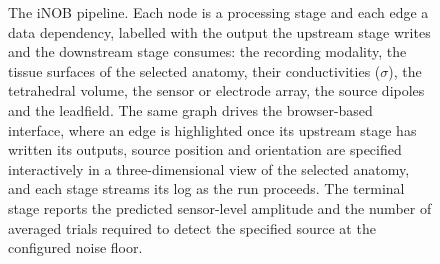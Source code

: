 \documentclass[11pt]{article}
\begin{document}
\begin{figure}[htbp]
\centering

\caption{The iNOB pipeline. Each node is a processing stage and each
edge a data dependency, labelled with the output the upstream stage
writes and the downstream stage consumes: the recording modality, the
tissue surfaces of the selected anatomy, their conductivities
($\sigma$), the tetrahedral volume, the sensor or electrode array, the
source dipoles and the leadfield. The same graph drives the browser-based
interface, where an edge is highlighted once its upstream stage has
written its outputs, source position and orientation are specified
interactively in a three-dimensional view of the selected anatomy, and
each stage streams its log as the run proceeds. The terminal stage
reports the predicted sensor-level amplitude and the number of averaged
trials required to detect the specified source at the configured noise
floor.}
\label{fig:1}
\end{figure}
\end{document}
